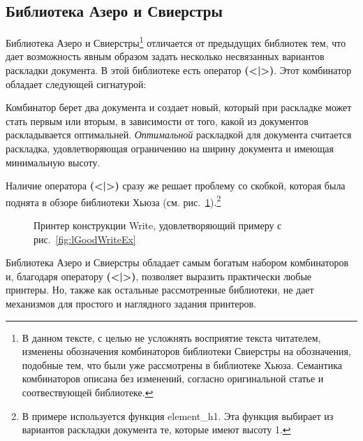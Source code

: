 \newpage

\subsection{Библиотека Азеро и Свиерстры}

Библиотека Азеро и Свиерстры\footnote{
В данном тексте, с целью не усложнять восприятие текста читателем, изменены обозначения комбинаторов библиотеки Свиерстры на обозначения, подобные тем, что были уже рассмотрены в библиотеке Хьюза. Семантика комбинаторов описана без изменений, согласно оригинальной статье и соотвествующей библиотеке.
}\cite{swierstra} отличается от предыдущих библиотек тем, что дает возможность явным образом задать несколько несвязанных вариантов раскладки документа. В этой библиотеке есть оператор \textbf{(<|>)}. Этот комбинатор обладает следующей сигнатурой:



Комбинатор берет два документа и создает новый, который при раскладке может стать первым или вторым, в зависимости от того, какой из документов раскладывается оптимальней. \textit{Оптимальной} раскладкой для документа считается раскладка, удовлетворяющая ограничению на ширину документа и имеющая минимальную высоту.

Наличие оператора \textbf{(<|>)} сразу же решает проблему со скобкой, которая была поднята в обзоре библиотеки Хьюза (см. рис.~\ref{fig:bracketSwierstra}).\footnote{
	В примере используется функция element\_h1. Эта функция выбирает из вариантов раскладки документа те, которые имеют высоту 1.
}

\begin{figure}[h!]
	
	\caption{Принтер конструкции Write, удовлетворяющий примеру с рис.~\ref{fig:lGoodWriteEx}}
	\label{fig:bracketSwierstra}
\end{figure}

Библиотека Азеро и Свиерстры обладает самым богатым набором комбинаторов и, благодаря оператору \textbf{(<|>)}, позволяет выразить практически любые принтеры. Но, также как остальные рассмотренные библиотеки, не дает механизмов для простого и наглядного задания принтеров.